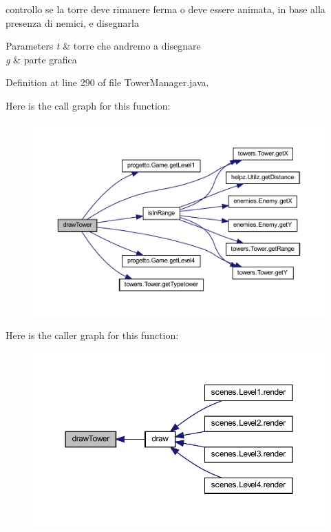 controllo se la torre deve rimanere ferma o deve essere animata, in base alla presenza di nemici, e disegnarla 


\begin{DoxyParams}{Parameters}
{\em t} & torre che andremo a disegnare \\
\hline
{\em g} & parte grafica \\
\hline
\end{DoxyParams}


Definition at line 290 of file Tower\+Manager.\+java.

Here is the call graph for this function\+:\nopagebreak
\begin{figure}[H]
\begin{center}
\leavevmode
\includegraphics[width=350pt]{classmanagers_1_1_tower_manager_a2cbe196e347dcc9a69a4d3dfdbec72de_cgraph}
\end{center}
\end{figure}
Here is the caller graph for this function\+:\nopagebreak
\begin{figure}[H]
\begin{center}
\leavevmode
\includegraphics[width=350pt]{classmanagers_1_1_tower_manager_a2cbe196e347dcc9a69a4d3dfdbec72de_icgraph}
\end{center}
\end{figure}
\mbox{\label{classmanagers_1_1_tower_manager_a4345f2e80059788e5ab1dd1cf0ff2c04}} 
